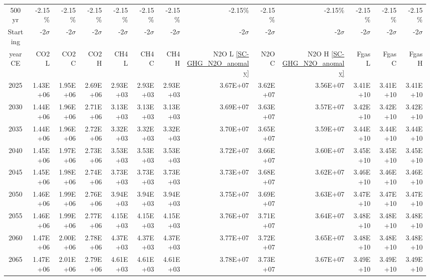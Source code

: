 \documentclass{article}
\begin{document}
\begin{table}
\begin{tabular}{crrr|rrr|rrr|rrr}
         &            &            &            &            &            &            &            &            &            &            &            &            \\ \hline
500 yr   & -2.15\%    & -2.15\%    & -2.15\%    & -2.15\%    & -2.15\%    & -2.15\%    & -2.15\%    & -2.15\%    & -2.15\%    & -2.15\%    & -2.15\%    & -2.15\%    \\
Starting & -2$\sigma$ & -2$\sigma$ & -2$\sigma$ & -2$\sigma$ & -2$\sigma$ & -2$\sigma$ & -2$\sigma$ & -2$\sigma$ & -2$\sigma$ & -2$\sigma$ & -2$\sigma$ & -2$\sigma$ \\
year CE  & CO2 L      & CO2 C      & CO2 H      & CH4 L      & CH4 C      & CH4 H      & N2O L \ref{SC-GHG_N2O_anomaly}     & N2O C      & N2O H \ref{SC-GHG_N2O_anomaly}      & Fgas L     & Fgas C     & Fgas H     \\
2025     & 1.43E+06   & 1.95E+06   & 2.69E+06   & 2.93E+03   & 2.93E+03   & 2.93E+03   & 3.67E+07   & 3.62E+07   & 3.56E+07   & 3.41E+10   & 3.41E+10   & 3.41E+10   \\
2030     & 1.44E+06   & 1.96E+06   & 2.71E+06   & 3.13E+03   & 3.13E+03   & 3.13E+03   & 3.69E+07   & 3.63E+07   & 3.57E+07   & 3.42E+10   & 3.42E+10   & 3.42E+10   \\
2035     & 1.44E+06   & 1.96E+06   & 2.72E+06   & 3.32E+03   & 3.32E+03   & 3.32E+03   & 3.70E+07   & 3.65E+07   & 3.59E+07   & 3.44E+10   & 3.44E+10   & 3.44E+10   \\
2040     & 1.45E+06   & 1.97E+06   & 2.73E+06   & 3.53E+03   & 3.53E+03   & 3.53E+03   & 3.72E+07   & 3.66E+07   & 3.60E+07   & 3.45E+10   & 3.45E+10   & 3.45E+10   \\
2045     & 1.45E+06   & 1.98E+06   & 2.74E+06   & 3.73E+03   & 3.73E+03   & 3.73E+03   & 3.73E+07   & 3.68E+07   & 3.62E+07   & 3.46E+10   & 3.46E+10   & 3.46E+10   \\
2050     & 1.46E+06   & 1.99E+06   & 2.76E+06   & 3.94E+03   & 3.94E+03   & 3.94E+03   & 3.75E+07   & 3.69E+07   & 3.63E+07   & 3.47E+10   & 3.47E+10   & 3.47E+10   \\
2055     & 1.46E+06   & 1.99E+06   & 2.77E+06   & 4.15E+03   & 4.15E+03   & 4.15E+03   & 3.76E+07   & 3.71E+07   & 3.64E+07   & 3.48E+10   & 3.48E+10   & 3.48E+10   \\
2060     & 1.47E+06   & 2.00E+06   & 2.78E+06   & 4.37E+03   & 4.37E+03   & 4.37E+03   & 3.77E+07   & 3.72E+07   & 3.65E+07   & 3.48E+10   & 3.48E+10   & 3.48E+10   \\
2065     & 1.47E+06   & 2.01E+06   & 2.79E+06   & 4.61E+03   & 4.61E+03   & 4.61E+03   & 3.78E+07   & 3.73E+07   & 3.67E+07   & 3.49E+10   & 3.49E+10   & 3.49E+10   \\

\end{tabular}
\end{table}
\end{document}
